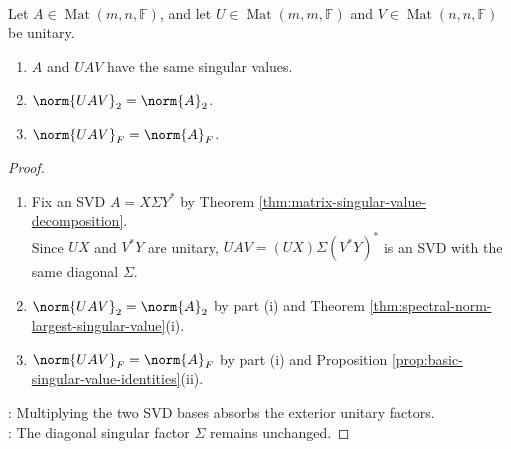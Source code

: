 \begin{proposition} \label{prop:unitary-invariance-of-singular-values} \\
Let $A\in\operatorname{Mat}(m,n,\mathbb{F})$, and let $U\in\operatorname{Mat}(m,m,\mathbb{F})$ and $V\in\operatorname{Mat}(n,n,\mathbb{F})$ be unitary.
\begin{enumerate}[label=(\roman*)]
\setlength{\itemsep}{0pt}
\item $A$ and $UAV$ have the same singular values.
\item $\norm{UAV}_2=\norm{A}_2$.
\item $\norm{UAV}_F=\norm{A}_F$.
\end{enumerate}
\begin{proof}
\begin{enumerate}[label=(\roman*)]
\setlength{\itemsep}{0pt}
\item Fix an SVD $A=X\Sigma Y^*$ by Theorem \ref{thm:matrix-singular-value-decomposition}.\\
Since $UX$ and $V^*Y$ are unitary, $UAV=(UX)\Sigma(V^*Y)^*$ is an SVD with the same diagonal $\Sigma$.
\item $\norm{UAV}_2=\norm{A}_2$ by part (i) and Theorem \ref{thm:spectral-norm-largest-singular-value}(i).
\item $\norm{UAV}_F=\norm{A}_F$ by part (i) and Proposition \ref{prop:basic-singular-value-identities}(ii).
\end{enumerate}
: Multiplying the two SVD bases absorbs the exterior unitary factors.\\
: The diagonal singular factor $\Sigma$ remains unchanged.
\end{proof}
\end{proposition}


